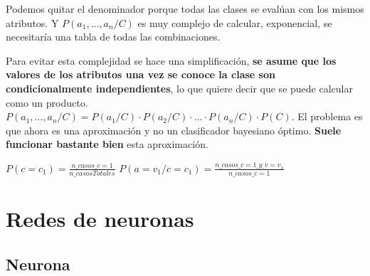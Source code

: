 \documentclass[12pt, twoside, openright]{report} %
\begin{document}
Podemos quitar el denominador porque todas las clases se evalúan con los
mismos atributos. Y \(P(a_1, ...,a_n/C)\) es muy complejo de calcular,
exponencial, se necesitaría una tabla de todas las combinaciones.

Para evitar esta complejidad se hace una simplificación, \textbf{se asume que los valores de los atributos una vez se conoce la clase son
	condicionalmente independientes}, lo que quiere decir que se puede
calcular como un producto.
\(P(a_1, ...,a_n/C) = P(a_1/C) \cdot P(a_2/C) \cdot ... \cdot P(a_n/C) \cdot P(C)\).
El problema es que ahora es una aproximación y no un clasificador
bayesiano óptimo. \textbf{Suele funcionar bastante bien} esta
aproximación.

\(P(c=c_1)= \frac {n\_casos\_c=1}{n\_casosTotales}\)
\(P(a=v_1/c=c_1)= \frac {n\_casos\_c=1\_y\_v=v_1}{n\_casos\_c=1}\)

\section{Redes de neuronas}

\subsection{Neurona}
\end{document}
